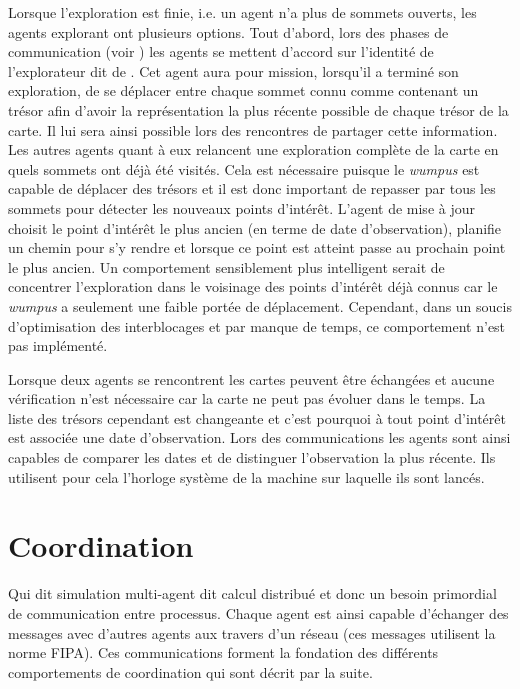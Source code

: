 \documentclass[11pt]{article}
\begin{document}
Lorsque l'exploration est finie, i.e. un agent n'a plus de sommets ouverts, les agents explorant ont plusieurs options. Tout d'abord, lors des phases de communication (voir ) les agents se mettent d'accord sur l'identité de l'explorateur dit de . Cet agent aura pour mission, lorsqu'il a terminé son exploration, de se déplacer entre chaque sommet connu comme contenant un trésor afin d'avoir la représentation la plus récente possible de chaque trésor de la carte. Il lui sera ainsi possible lors des rencontres de partager cette information. Les autres agents quant à eux relancent une exploration complète de la carte en  quels sommets ont déjà été visités. Cela est nécessaire puisque le \textit{wumpus} est capable de déplacer des trésors et il est donc important de repasser par tous les sommets pour détecter les nouveaux points d'intérêt. L'agent de mise à jour choisit le point d'intérêt le plus ancien (en terme de date d'observation), planifie un chemin pour s'y rendre et lorsque ce point est atteint passe au prochain point le plus ancien. Un comportement sensiblement plus intelligent serait de concentrer l'exploration dans le voisinage des points d'intérêt déjà connus car le \textit{wumpus} a seulement une faible portée de déplacement. Cependant, dans un soucis d'optimisation des interblocages et par manque de temps, ce comportement n'est pas implémenté.

Lorsque deux agents se rencontrent les cartes peuvent être échangées et aucune vérification n'est nécessaire car la carte ne peut pas évoluer dans le temps. La liste des trésors cependant est changeante et c'est pourquoi à tout point d'intérêt est associée une date d'observation. Lors des communications les agents sont ainsi capables de comparer les dates et de distinguer l'observation la plus récente. Ils utilisent pour cela l'horloge système de la machine sur laquelle ils sont lancés.
\section{Coordination}

Qui dit simulation multi-agent dit calcul distribué et donc un besoin primordial de communication entre processus. Chaque agent est ainsi capable d'échanger des messages avec d'autres agents aux travers d'un réseau (ces messages utilisent la norme FIPA). Ces communications forment la fondation des différents comportements de coordination qui sont décrit par la suite.
\end{document}
